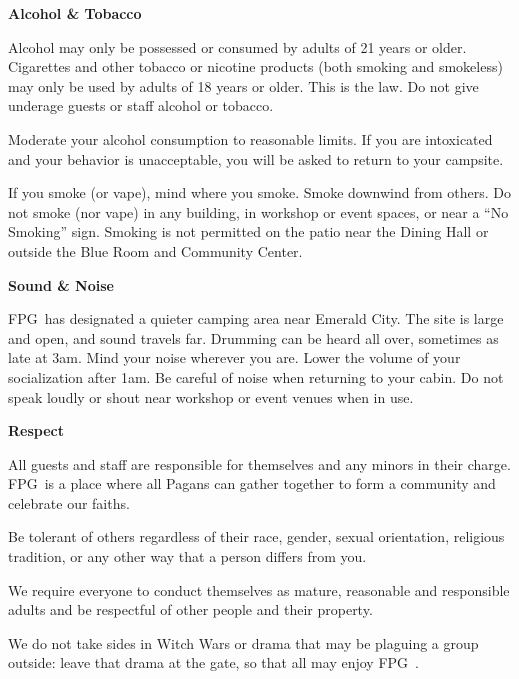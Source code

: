 \documentclass[9pt,twoside,openright,final,article]{memoir}
\def\fpg{{\beltanefamily FPG\ }}
\renewcommand{\subsection}[1]{%
  \vspace{6pt}%
  \needspace{1.25in}%
  \begin{center}\textbf{\Large \beltanefamily #1}\end{center}

  \nopagebreak}
\begin{document}
\begin{multicols}{2}
  \subsection{Alcohol \& Tobacco}

  Alcohol may only be possessed or consumed by adults of 21 years or
  older. Cigarettes and other tobacco or nicotine products (both
  smoking and smokeless) may only be used by adults of 18 years or
  older. This is the law. Do not give underage guests or staff alcohol
  or tobacco.

  Moderate your alcohol consumption to reasonable limits. If you are
  intoxicated and your behavior is unacceptable, you will be asked to
  return to your campsite.

  If you smoke (or vape), mind where you smoke. Smoke downwind from
  others. Do not smoke (nor vape) in any building, in workshop or
  event spaces, or near a ``No Smoking'' sign. Smoking is not
  permitted on the patio near the Dining Hall or outside the Blue Room
  and Community Center.

  \subsection{Sound \& Noise}

  \fpg has designated a quieter camping area near Emerald City. The
  site is large and open, and sound travels far. Drumming can be heard
  all over, sometimes as late at 3am. Mind your noise wherever you
  are. Lower the volume of your socialization after 1am. Be careful of
  noise when returning to your cabin. Do not speak loudly or shout
  near workshop or event venues when in use.


  \subsection{Respect}

  All guests and staff are responsible for themselves and any minors
  in their charge.  \fpg is a place where all Pagans can gather
  together to form a community and celebrate our faiths.

  Be tolerant of others regardless of their race, gender, sexual
  orientation, religious tradition, or any other way that a person
  differs from you.

  We require everyone to conduct themselves as mature, reasonable and
  responsible adults and be respectful of other people and their
  property.

  We do not take sides in Witch Wars or drama that may be plaguing a
  group outside: leave that drama at the gate, so that all may enjoy
  \fpg.


\end{multicols}
\end{document}
